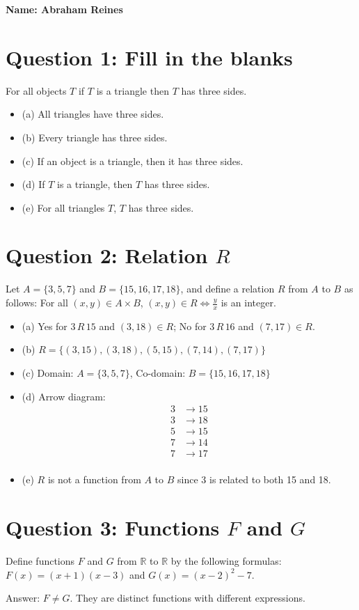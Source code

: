 \documentclass{article}
\begin{document}
\textbf{Name: Abraham Reines}

\section*{Question 1: Fill in the blanks}
For all objects \( T \) if \( T \) is a triangle then \( T \) has three sides.

\begin{itemize}
\item (a) All triangles have three sides.
\item (b) Every triangle has three sides.
\item (c) If an object is a triangle, then it has three sides.
\item (d) If \( T \) is a triangle, then \( T \) has three sides.
\item (e) For all triangles \( T \), \( T \) has three sides.
\end{itemize}

\section*{Question 2: Relation \( R \)}
Let \( A = \{3,5,7\} \) and \( B = \{15,16,17,18\} \), and define a relation \( R \) from \( A \) to \( B \) as follows: For all \((x,y) \in A \times B\), \((x,y) \in R \Leftrightarrow \frac{y}{x}\) is an integer.

\begin{itemize}
\item (a) Yes for \( 3 \, R \, 15 \) and \( (3,18) \in R \); No for \( 3 \, R \, 16 \) and \( (7,17) \in R \).
\item (b) \( R = \{ (3,15), (3,18), (5,15), (7,14), (7,17) \} \)
\item (c) Domain: \( A = \{3,5,7\} \), Co-domain: \( B = \{15,16,17,18\} \)
\item (d) Arrow diagram:
\begin{align*}
3 &\rightarrow 15 \\
3 &\rightarrow 18 \\
5 &\rightarrow 15 \\
7 &\rightarrow 14 \\
7 &\rightarrow 17 \\
\end{align*}
\item (e) \( R \) is not a function from \( A \) to \( B \) since 3 is related to both 15 and 18.
\end{itemize}

\section*{Question 3: Functions \( F \) and \( G \)}
Define functions \( F \) and \( G \) from \( \mathbb{R} \) to \( \mathbb{R} \) by the following formulas:
\( F(x) = (x+1)(x-3) \) and \( G(x) = (x-2)^2 - 7 \).

Answer: \( F \neq G \). They are distinct functions with different expressions.
\end{document}
